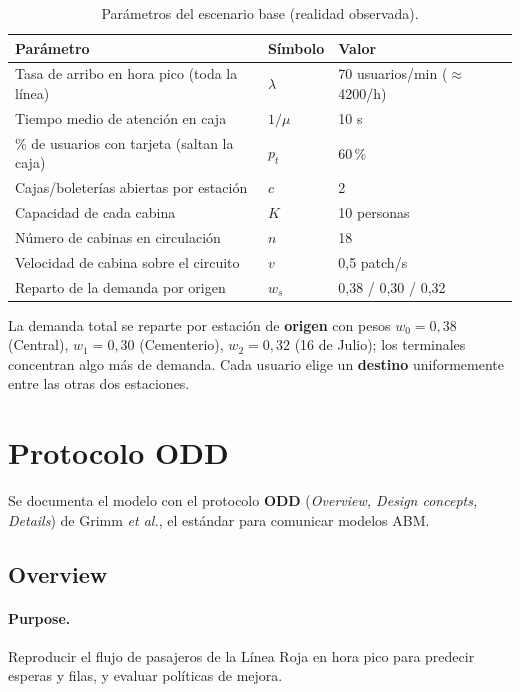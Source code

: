 \documentclass[11pt,a4paper]{article}
\begin{document}
\begin{table}[h]
\centering
\caption{Parámetros del escenario base (realidad observada).}
\label{tab:datos}
\renewcommand{\arraystretch}{1.15}
\begin{tabular}{lll}
\toprule
Parámetro & Símbolo & Valor \\
\midrule
Tasa de arribo en hora pico (toda la línea) & $\lambda$ & 70 usuarios/min ($\approx$ 4200/h) \\
Tiempo medio de atención en caja & $1/\mu$ & 10 s \\
\% de usuarios con tarjeta (saltan la caja) & $p_t$ & 60\,\% \\
Cajas/boleterías abiertas por estación & $c$ & 2 \\
Capacidad de cada cabina & $K$ & 10 personas \\
Número de cabinas en circulación & $n$ & 18 \\
Velocidad de cabina sobre el circuito & $v$ & 0,5 patch/s \\
Reparto de la demanda por origen & $w_s$ & 0,38 / 0,30 / 0,32 \\
\bottomrule
\end{tabular}
\end{table}

La demanda total se reparte por estación de \textbf{origen} con pesos
$w_0=0{,}38$ (Central), $w_1=0{,}30$ (Cementerio), $w_2=0{,}32$ (16 de Julio); los
terminales concentran algo más de demanda. Cada usuario elige un \textbf{destino}
uniformemente entre las otras dos estaciones.

\section{Protocolo ODD}

Se documenta el modelo con el protocolo \textbf{ODD} (\emph{Overview, Design
concepts, Details}) de Grimm \emph{et al.}, el estándar para comunicar modelos ABM.

\subsection{Overview}
\paragraph{Purpose.} Reproducir el flujo de pasajeros de la Línea Roja en hora pico
para predecir esperas y filas, y evaluar políticas de mejora.
\end{document}

